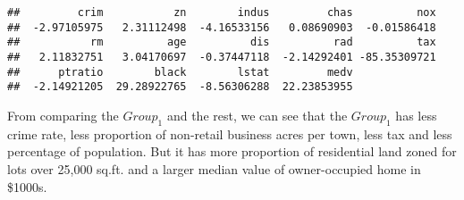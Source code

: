 \documentclass[]{article}
\newenvironment{Shaded}{\begin{snugshade}}{\end{snugshade}}
\newcommand{\DecValTok}[1]{\textcolor[rgb]{0.00,0.00,0.81}{#1}}
\newcommand{\KeywordTok}[1]{\textcolor[rgb]{0.13,0.29,0.53}{\textbf{#1}}}
\newcommand{\NormalTok}[1]{#1}
\newcommand{\OperatorTok}[1]{\textcolor[rgb]{0.81,0.36,0.00}{\textbf{#1}}}
\newcommand{\StringTok}[1]{\textcolor[rgb]{0.31,0.60,0.02}{#1}}
\begin{document}
\begin{Shaded}
\end{Shaded}

\begin{verbatim}
##         crim           zn        indus         chas          nox 
##  -2.97105975   2.31112498  -4.16533156   0.08690903  -0.01586418 
##           rm          age          dis          rad          tax 
##   2.11832751   3.04170697  -0.37447118  -2.14292401 -85.35309721 
##      ptratio        black        lstat         medv 
##  -2.14921205  29.28922765  -8.56306288  22.23853955
\end{verbatim}

From comparing the \(Group_1\) and the rest, we can see that the
\(Group_1\) has less crime rate, less proportion of non-retail business
acres per town, less tax and less percentage of population. But it has
more proportion of residential land zoned for lots over 25,000 sq.ft.
and a larger median value of owner-occupied home in \$1000s.
\end{document}
